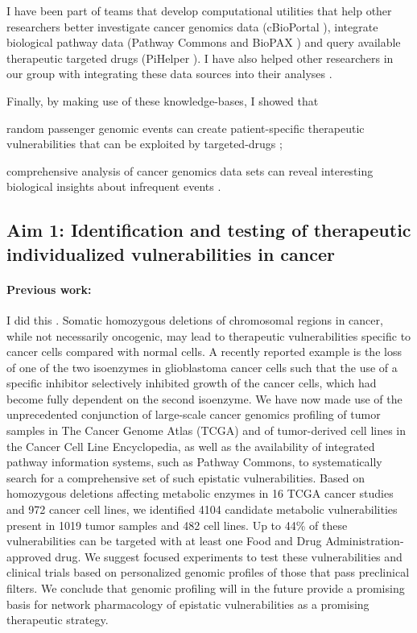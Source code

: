 \documentclass[12pt,letterpaper]{article}
\begin{document}
I have been part of teams that develop computational utilities that help other researchers better 
investigate cancer genomics data (cBioPortal \cite{gao2014cbioportal, cerami2012cbio}),
integrate biological pathway data (Pathway Commons and BioPAX \cite{demir2013using,babur2014integrating})
and query available therapeutic targeted drugs (PiHelper \cite{aksoy2013pihelper}).
I have also helped other researchers in our group with integrating these data sources into their analyses \cite{ciriello2013emerging,korkut2014perturbation,babur2014systematic}.

Finally, by making use of these knowledge-bases, 
I showed that 
\begin{inparaenum}[(i)]
 \item random passenger genomic events can create patient-specific therapeutic vulnerabilities that can be exploited by targeted-drugs \cite{aksoy2014prediction};
 \item comprehensive analysis of cancer genomics data sets can reveal interesting biological insights about infrequent events \cite{aksoy2014cancer}.
\end{inparaenum}


\subsection*{Aim 1: Identification and testing of therapeutic individualized vulnerabilities in cancer}
\paragraph{Previous work:} 
I did this \cite{aksoy2014prediction}.
Somatic homozygous deletions of chromosomal regions in cancer, while not necessarily oncogenic, may lead to therapeutic vulnerabilities specific to cancer cells compared with normal cells. 
A recently reported example is the loss of one of the two isoenzymes in glioblastoma cancer cells such that the use of a specific inhibitor selectively inhibited growth of the cancer cells, which had become fully dependent on the second isoenzyme. 
We have now made use of the unprecedented conjunction of large-scale cancer genomics profiling of tumor samples in The Cancer Genome Atlas (TCGA) and of tumor-derived cell lines in the Cancer Cell Line Encyclopedia, as well as the availability of integrated pathway information systems, such as Pathway Commons, to systematically search for a comprehensive set of such epistatic vulnerabilities. 
Based on homozygous deletions affecting metabolic enzymes in 16 TCGA cancer studies and 972 cancer cell lines, we identified 4104 candidate metabolic vulnerabilities present in 1019 tumor samples and 482 cell lines. 
Up to 44\% of these vulnerabilities can be targeted with at least one Food and Drug Administration-approved drug. 
We suggest focused experiments to test these vulnerabilities and clinical trials based on personalized genomic profiles of those that pass preclinical filters. 
We conclude that genomic profiling will in the future provide a promising basis for network pharmacology of epistatic vulnerabilities as a promising therapeutic strategy.
\end{document}
